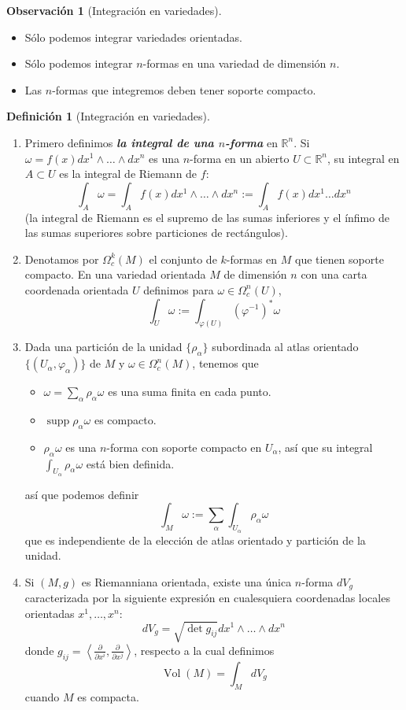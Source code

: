 \documentclass[spanish]{article}
\theoremstyle{definition}
\newtheorem*{defn}{Definición}
\newtheorem*{obs}{Observación}
\newcommand{\R}{\mathbb{R}}
\DeclareMathOperator{\supp}{supp}
\begin{document}
	\begin{obs}[Integración en variedades]\leavevmode
		\begin{itemize}
			\item Sólo podemos integrar variedades orientadas.
			\item Sólo podemos integrar $n$-formas en una variedad de dimensión $n$.
			\item Las $n$-formas que integremos deben tener soporte compacto.
		\end{itemize}
	\end{obs}
	\begin{defn}[Integración en variedades]\leavevmode
		\begin{enumerate}
			\item Primero definimos \textit{\textbf{la integral de una $n$-forma}} en $\R^n$. Si $\omega=f(x)dx^1\wedge\ldots\wedge dx^n$ es una $n$-forma en un abierto $U\subset\R^n$, su integral en $A\subset U$ es la integral de Riemann de $f$:
			\[\int_A\omega=\int_Af(x)dx^1\wedge\ldots\wedge dx^n:=\int_Af(x)dx^1\ldots dx^n\]
			(la integral de Riemann es el supremo de las sumas inferiores y el ínfimo de las sumas superiores sobre particiones de rectángulos).
			
			\item Denotamos por $\Omega_c^k(M)$ el conjunto de $k$-formas en $M$ que tienen soporte compacto. En una variedad orientada $M$ de dimensión $n$ con una carta coordenada orientada $U$ definimos para $\omega\in\Omega_c^n(U)$,
			\[\int_U\omega:=\int_{\varphi(U)}(\varphi^{-1})^*\omega\]
			\item Dada una partición de la unidad $\{\rho_\alpha\}$ subordinada al atlas orientado $\{(U_\alpha,\varphi_\alpha)\}$ de $M$ y $\omega\in\Omega_c^n(M)$, tenemos que
			\begin{itemize}
				\item $\omega=\sum_\alpha\rho_\alpha\omega$ es una suma finita en cada punto.
				\item $\supp \rho_\alpha\omega$ es compacto.
				\item $\rho_\alpha\omega$ es una $n$-forma con soporte compacto en $U_\alpha$, así que su integral $\int_{U_\alpha}\rho_\alpha\omega$ está bien definida.
			\end{itemize}
			así que podemos definir
			\[\int_M\omega:=\sum_\alpha\int_{U_\alpha}\rho_\alpha\omega\]
			que es independiente de la elección de atlas orientado y partición de la unidad.
			
			\item Si $(M,g)$ es Riemanniana orientada, existe una única $n$-forma $dV_g$ caracterizada por la siguiente expresión en cualesquiera coordenadas locales orientadas $x^1,\ldots,x^n$:
			\[dV_g=\sqrt{\det g_{ij}}dx^1\wedge\ldots\wedge dx^n\]
			donde $g_{ij}=\left\langle\frac{\partial}{\partial x^i},\frac{\partial}{\partial x^j}\right\rangle$, respecto a la cual definimos
			\[\operatorname{Vol}(M)=\int_MdV_g\]
			cuando $M$ es compacta.
			

\end{enumerate}
\end{defn}
\end{document}
